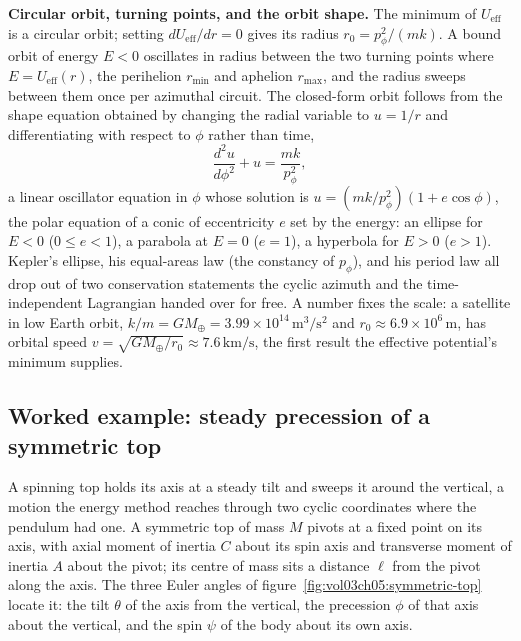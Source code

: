 \textbf{Circular orbit, turning points, and the orbit shape.} The minimum
of $U_{\mathrm{eff}}$ is a circular orbit; setting $dU_{\mathrm{eff}}/dr =
0$ gives its radius $r_0 = p_\phi^2/(mk)$. A bound orbit of energy $E < 0$
oscillates in radius between the two turning points where $E =
U_{\mathrm{eff}}(r)$, the perihelion $r_{\min}$ and aphelion $r_{\max}$, and
the radius sweeps between them once per azimuthal circuit. The closed-form
orbit follows from the shape equation obtained by changing the radial
variable to $u = 1/r$ and differentiating with respect to $\phi$ rather than
time,
\[
\frac{d^2 u}{d\phi^2} + u = \frac{mk}{p_\phi^2},
\]
a linear oscillator equation in $\phi$ whose solution is $u = (mk/p_\phi^2)
(1 + e\cos\phi)$, the polar equation of a conic of eccentricity $e$ set by
the energy: an ellipse for $E<0$ ($0\le e<1$), a parabola at $E=0$ ($e=1$),
a hyperbola for $E>0$ ($e>1$). Kepler's ellipse, his equal-areas law (the
constancy of $p_\phi$), and his period law all drop out of two conservation
statements the cyclic azimuth and the time-independent Lagrangian handed
over for free. A number fixes the scale: a satellite in low Earth orbit,
$k/m = GM_\oplus = 3.99\times 10^{14}\,\si{\meter\cubed\per\second
\squared}$ and $r_0 \approx 6.9\times 10^{6}\,\si{\meter}$, has orbital speed
$v = \sqrt{GM_\oplus/r_0} \approx 7.6\,\si{\kilo\meter\per\second}$, the
first result the effective potential's minimum supplies.



\subsection{Worked example: steady precession of a symmetric top}

A spinning top holds its axis at a steady tilt and sweeps it around the
vertical, a motion the energy method reaches through two cyclic coordinates
where the pendulum had one. A symmetric top of mass $M$ pivots at a fixed
point on its axis, with axial moment of inertia $C$ about its spin axis and
transverse moment of inertia $A$ about the pivot; its centre of mass sits a
distance $\ell$ from the pivot along the axis. The three Euler angles of
figure~\ref{fig:vol03ch05:symmetric-top} locate it: the tilt $\theta$ of the
axis from the vertical, the precession $\phi$ of that axis about the
vertical, and the spin $\psi$ of the body about its own axis.



